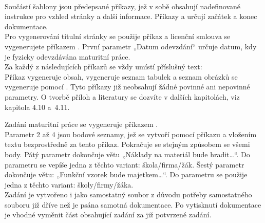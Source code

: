 \documentclass[a4paper, 12pt]{report}
\begin{document}
	\\
	Součástí šablony jsou předepsané příkazy, jež v sobě obsahují nadefinované instrukce pro vzhled stránky a další informace. Příkazy  a  určují začátek a konec dokumentace. \\
	Pro vygenerování titulní stránky se použije příkaz  a licenční smlouva se vygenerujete příkazem . První parametr „Datum odevzdání“ určuje datum, kdy je fyzicky odevzdávána maturitní práce.\\
	Za každý z následujících příkazů se vždy umístí příslušný text:\\
	Příkaz  vygeneruje obsah,  vygeneruje seznam tabulek a seznam obrázků se vygeneruje pomocí . Tyto příkazy již neobsahují žádné povinné ani nepovinné parametry. O tvorbě příloh a literatury se dozvíte v dalších kapitolách, viz kapitola 4.10 a~4.11.
	
	Zadání maturitní práce se vygeneruje příkazem .\\
	Parametr 2 až 4 jsou bodové seznamy, jež se vytvoří pomocí příkazu  a vložením textu bezprostředně za tento příkaz. Pokračuje se stejným způsobem se všemi body. Pátý parametr dokončuje větu „Náklady na materiál bude hradit…“. Do parametru se vepíše jedna z těchto variant: škola/firma/žák. Šestý parametr dokončuje větu: „Funkční vzorek bude majetkem…“. Do parametru se použije jedna z těchto variant: školy/firmy/žáka.\\
	Zadání je vytvořeno i jako samostatný soubor  z důvodu potřeby samostatného souboru již dříve než je psána samotná dokumentace. Po vytisknutí dokumentace je vhodné vyměnit část obsahující zadání za již potvrzené zadání. 
	
\end{document}
